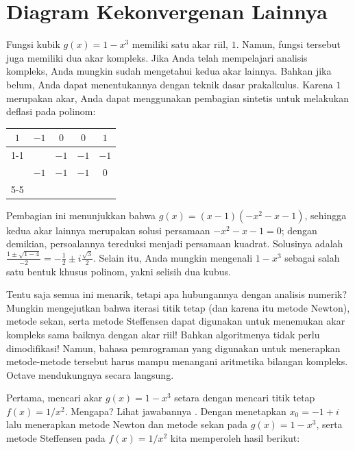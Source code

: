 
\section{\label{sec:moreConvergenceDiagrams}Diagram Kekonvergenan Lainnya}

Fungsi kubik $g(x)=1-x^{3}$ memiliki satu akar riil, $1$. Namun,
fungsi tersebut juga memiliki dua akar kompleks. Jika Anda telah mempelajari
analisis kompleks, Anda mungkin sudah mengetahui kedua akar lainnya.
Bahkan jika belum, Anda dapat menentukannya dengan teknik dasar prakalkulus.
Karena $1$ merupakan akar, Anda dapat menggunakan pembagian sintetis
untuk melakukan deflasi pada polinom:

\begin{center}
\begin{tabular}{ccccc}
\multicolumn{1}{c|}{$1$} & $-1$ & $0$ & $0$ & $1$\tabularnewline
\cline{1-1}
 &  & $-1$ & $-1$ & $-1$\tabularnewline
\hline 
 & $-1$ & $-1$ & \multicolumn{1}{c|}{$-1$} & \multicolumn{1}{c|}{$0$}\tabularnewline
\cline{5-5}
\end{tabular}
\par\end{center}

\noindent Pembagian ini menunjukkan bahwa $g(x)=(x-1)(-x^{2}-x-1)$,
sehingga kedua akar lainnya merupakan solusi persamaan $-x^{2}-x-1=0$;
dengan demikian, persoalannya tereduksi menjadi persamaan kuadrat.
Solusinya adalah $\frac{1\pm\sqrt{1-4}}{-2}=-\frac{1}{2}\pm i\frac{\sqrt{3}}{2}$.
Selain itu, Anda mungkin mengenali $1-x^{3}$ sebagai salah satu bentuk
khusus polinom, yakni selisih dua kubus. 

Tentu saja semua ini menarik, tetapi apa hubungannya dengan analisis
numerik? Mungkin mengejutkan bahwa iterasi titik tetap (dan karena
itu metode Newton), metode sekan, serta metode Steffensen dapat digunakan
untuk menemukan akar kompleks sama baiknya dengan akar riil! Bahkan
algoritmenya tidak perlu dimodifikasi! Namun, bahasa pemrograman yang
digunakan untuk menerapkan metode-metode tersebut harus mampu menangani
aritmetika bilangan kompleks. Octave mendukungnya secara langsung.

Pertama, mencari akar $g(x)=1-x^{3}$ setara dengan mencari titik
tetap $f(x)=1/x^{2}$. Mengapa? Lihat jawabannya .
Dengan menetapkan $x_{0}=-1+i$ lalu menerapkan metode Newton dan
metode sekan pada $g(x)=1-x^{3}$, serta metode Steffensen pada $f(x)=1/x^{2}$
kita memperoleh hasil berikut:

